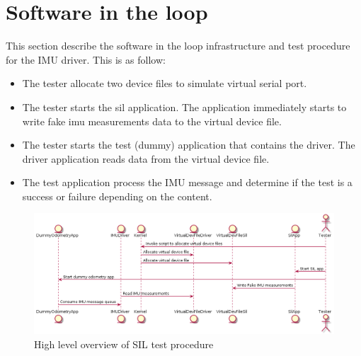 \section{Software in the loop}
This section describe the software in the loop infrastructure and test procedure for the IMU driver. This is as follow:
\begin{itemize}
    \item The tester allocate two device files to simulate virtual serial port.
    \item The tester starts the sil application. The application immediately starts to write fake imu measurements data to the virtual device file.
    \item The tester starts the test (dummy) application that contains the driver. The driver application reads data from the virtual device file.
    \item The test application process the IMU message and determine if the test is a success or failure depending on the content.
\end{itemize}



\begin{figure}[ht]
    \centering
    \includegraphics[width=0.75 \textwidth]{diagrams/software_in_the_loop.png}
    \caption{High level overview of SIL test procedure}
    \label{reference}
\end{figure}
